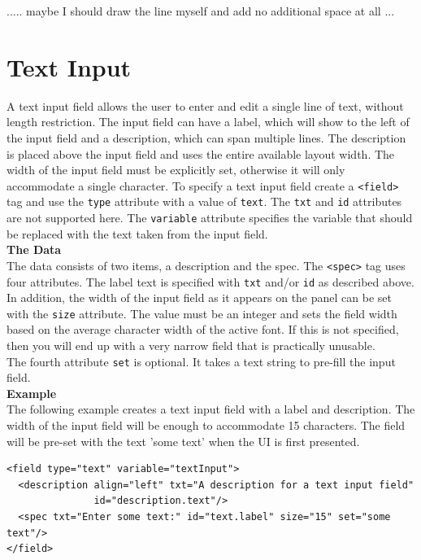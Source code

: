  ..... maybe I should draw the line myself and add no additional space at all ...

\section{Text Input}

A text input field allows the user to enter and edit a single line of
text, without length restriction. The input field can have a label,
which will show to the left of the input field and a description, which
can span multiple lines. The description is placed above the input field
and uses the entire available layout width. The width of the input field
must be explicitly set, otherwise it will only accommodate a single
character. To specify a text input field create a \texttt{<field>} tag
and use the \texttt{type} attribute with a value of \texttt{text}. The
\texttt{txt} and \texttt{id} attributes are not supported here. The
\texttt{variable} attribute specifies the variable that should be
replaced with the text taken from the input field.\\

\textbf{The Data}\\

The data consists of two items, a description and the spec. The
\texttt{<spec>} tag uses four attributes. The label text is specified with
\texttt{txt} and/or \texttt{id} as described above. In addition, the
width of the input field as it appears on the panel can be set with the
\texttt{size} attribute. The value must be an integer and sets the field
width based on the average character width of the active font. If this
is not specified, then you will end up with a very narrow field that is
practically unusable.\\

The fourth attribute \texttt{set} is optional. It takes a text string to
pre-fill the input field.\\

\textbf{Example}\\

The following example creates a text input field with a label and
description. The width of the input field will be enough to accommodate
15 characters. The field will be pre-set with the text 'some text' when
the UI is first presented.\\

\footnotesize
\begin{verbatim}
<field type="text" variable="textInput">
  <description align="left" txt="A description for a text input field"
               id="description.text"/>
  <spec txt="Enter some text:" id="text.label" size="15" set="some text"/>
</field>
\end{verbatim}
\normalsize

